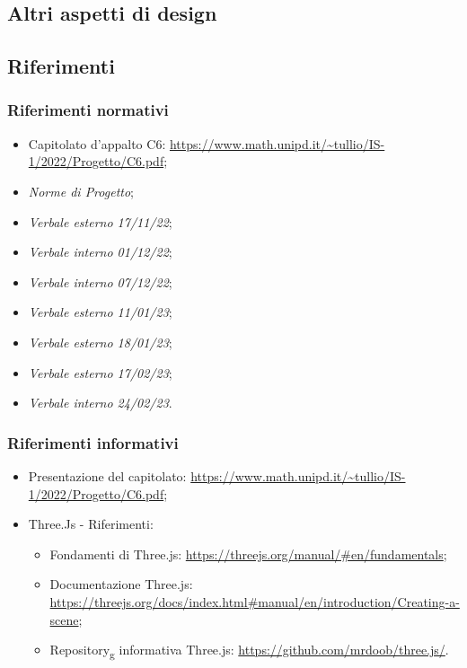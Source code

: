 \subsection{Altri aspetti di design}
























\subsection{Riferimenti}
\subsubsection{Riferimenti normativi}
\begin{itemize}
\item Capitolato d’appalto C6: \url{https://www.math.unipd.it/~tullio/IS-1/2022/Progetto/C6.pdf};
\item \textit{Norme di Progetto};
\item \textit{Verbale esterno 17/11/22};
\item \textit{Verbale interno 01/12/22};
\item \textit{Verbale interno 07/12/22};
\item \textit{Verbale esterno 11/01/23};
\item \textit{Verbale esterno 18/01/23};
\item \textit{Verbale esterno 17/02/23};
\item \textit{Verbale interno 24/02/23}.
\end{itemize}

\subsubsection{Riferimenti informativi}
\begin{itemize}
\item Presentazione del capitolato: \url{https://www.math.unipd.it/~tullio/IS-1/2022/Progetto/C6.pdf};

\item Three.Js - Riferimenti:
\begin{itemize}
\item Fondamenti di Three.js: \url{https://threejs.org/manual/#en/fundamentals};
\item Documentazione Three.js: \url{https://threejs.org/docs/index.html#manual/en/introduction/Creating-a-scene};
\item Repository\textsubscript{g} informativa Three.js: \url{https://github.com/mrdoob/three.js/}.
\end{itemize} 
\end{itemize} 